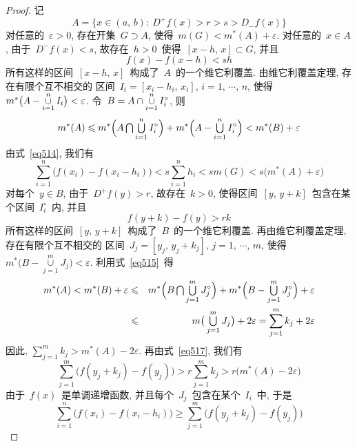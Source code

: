\begin{proof}
记
\[
A = \{x \in (a,\,b):\: D^+f(x) > r > s >  D_-f(x)\}
\]
对任意的~$\varepsilon > 0$, 存在开集~$G \supset A$, 使得~$m(G) < m^*(A) + \varepsilon$. 对任意的~$x \in A$, 由于~$D^-f(x) < s$, 故存在~$h > 0$~使得~$[x-h,\,x] \subset G$, 并且
\begin{equation} \label{eq514}
f(x) - f(x-h) < sh
\end{equation}
所有这样的区间~$[x-h,\,x]$~构成了~$A$~的一个维它利覆盖. 由维它利覆盖定理, 存在有限个互不相交的
区间~$I_i = [x_i-h_i,\,x_i], \, i=1,\,\cdots,\,n$, 使得~$m^*\big( A- \mathop{\mathop{\cup}}\limits_{i=1}^n I_i \big) < \varepsilon$. 令~$B = A \cap \mathop{\cup}\limits_{i=1}^n I_i^\circ$, 则
\begin{equation} \label{eq515}
m^*(A) \leqslant m^*\Big( A \mathop{\textstyle{\bigcap}} \mathop{\textstyle{\bigcup}}_{i=1}^n I_i^\circ \Big) + m^*\Big( A - \mathop{\textstyle{\bigcup}}_{i=1}^n I_i^\circ \Big) < m^*(B) + \varepsilon
\end{equation}
由式~\eqref{eq514}, 我们有
\begin{equation} \label{eq516}
\sum_{i=1}^n \big( f(x_i)-f(x_i-h_i) \big) < s \sum_{i=1}^n h_i < s m(G) < s\big( m^*(A)+\varepsilon \big)
\end{equation}
对每个~$y \in B$, 由于~$D^+f(y) > r$, 故存在~$k > 0$, 使得区间~$[y,\,y+k]$~包含在某个区间~$I_i^\circ$~内, 并且
\begin{equation} \label{eq517}
f(y+k) - f(y) >rk
\end{equation}
所有这样的区间~$[y,\,y+k]$~构成了~$B$~的一个维它利覆盖. 再由维它利覆盖定理, 存在有限个互不相交的
区间~$J_j = [y_j,\,y_j+k_j], \, j=1,\,\cdots,\,m$, 使得~$m^*\big( B- \mathop{\cup}\limits_{j=1}^m J_j \big) < \varepsilon$. 利用式~\eqref{eq515}~得
\begin{eqnarray*}
m^*(A) < m^*(B) + \varepsilon &\leqslant& m^*\Big( B \mathop{\textstyle{\bigcap}} \mathop{\textstyle{\bigcup}}_{j=1}^m J_j^\circ \Big) + m^*\Big( B - \mathop{\textstyle{\bigcup}}_{j=1}^m J_j^\circ \Big) + \varepsilon \\
&\leqslant& m\big( \mathop{\textstyle{\bigcup}}_{j=1}^m J_j \big) + 2\varepsilon = \sum_{j=1}^m k_j + 2\varepsilon
\end{eqnarray*}
因此, $\sum\limits_{j=1}^m k_j > m^*(A) - 2\varepsilon$. 再由式~\eqref{eq517}, 我们有
\begin{equation} \label{eq518}
\sum_{j=1}^m \big( f(y_j+k_j) -f(y_j) \big) > r \sum_{j=1}^m k_j > r\big( m^*(A) -2\varepsilon \big)
\end{equation}
由于~$f(x)$~是单调递增函数, 并且每个~$J_j$~包含在某个~$I_i$~中, 于是
\begin{equation} \label{eq519}
\sum_{i=1}^n \big( f(x_i)-f(x_i-h_i) \big) \geqslant \sum_{j=1}^m \big( f(y_j+k_j) -f(y_j) \big)

\end{equation}
\end{proof}
